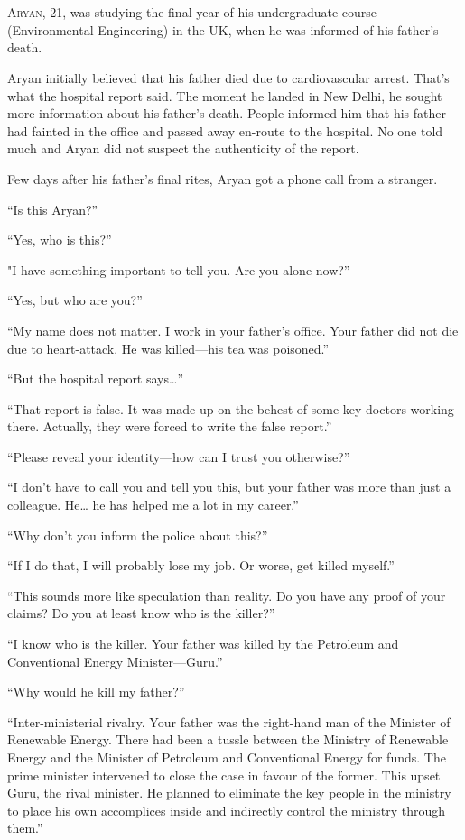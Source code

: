 \chapter{}

\lettrine{A}{ryan}, 21, was studying the final year of his undergraduate course
(Environmental Engineering) in the UK, when he was informed of his father's
death.

Aryan initially believed that his father died due to cardiovascular arrest.
That's what the hospital report said. The moment he landed in New Delhi, he
sought more information about his father's death. People informed him that his
father had fainted in the office and passed away en-route to the hospital. No
one told much and Aryan did not suspect the authenticity of the report.

Few days after his father's final rites, Aryan got a phone call from a stranger.

“Is this Aryan?”

“Yes, who is this?”

"I have something important to tell you. Are you alone now?”

“Yes, but who are you?”

“My name does not matter. I work in your father's office. Your father did not
die due to heart-attack. He was killed—his tea was poisoned.”

“But the hospital report says…”

“That report is false. It was made up on the behest of some key doctors working
there. Actually, they were forced to write the false report.”

“Please reveal your identity—how can I trust you otherwise?”

“I don't have to call you and tell you this, but your father was more than just
a colleague. He… he has helped me a lot in my career.”

“Why don't you inform the police about this?”

“If I do that, I will probably lose my job. Or worse, get killed myself.”

“This sounds more like speculation than reality. Do you have any proof of your
claims? Do you at least know who is the killer?”

“I know who is the killer. Your father was killed by the Petroleum and
Conventional Energy Minister—Guru.”

“Why would he kill my father?”

“Inter-ministerial rivalry. Your father was the right-hand man of the Minister
of Renewable Energy. There had been a tussle between the Ministry of Renewable Energy
and the Minister of Petroleum and Conventional Energy for funds. The prime minister
intervened to close the case in favour of the former. This
upset Guru, the rival minister. He planned to eliminate the key people in the
ministry to place his own accomplices inside and indirectly
control the ministry through them.”

